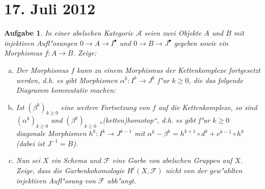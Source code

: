 \documentclass[paper = A4, fontsize=12pt, numbers=noendperiod, chapterprefix=true]{scrbook}
\theoremstyle{break}
\newtheorem{Aufg}{Aufgabe}
\theoremstyle{nonumberbreak}
\theoremstyle{nonumberplain}
\newcommand{\F}{\mathcal{F}} %
\begin{document}
\newpage
\section{17. Juli 2012}
\setcounter{Aufg}{0}
\setcounter{Loes}{0}

\begin{Aufg}
In einer abelschen Kategorie $\mathcal{A}$ seien zwei Objekte $A$ und $B$ mit injektiven Aufl"osungen $0 \to A \to I^\bullet$ und $0 \to B \to J^\bullet$ gegeben sowie ein Morphismus $f \colon A \to B$. Zeige:
\begin{enumerate}[a)]
 \item Der Morphismus $f$ kann zu einem Morphismus der Kettenkomplexe fortgesetzt werden, d.h. es gibt Morphismen $\alpha^k\colon I^k \to J^k$ f"ur $k \geq 0$, die das folgende Diagramm kommutativ machen:
    \begin{center}
  \end{center}
\item Ist $(\beta^k)_{k \geq 0}$ eine weitere Fortsetzung von $f$ auf die Kettenkomplexe, so sind $(\alpha^k)_{k \geq 0}$ und $(\beta^k)_{k\geq 0}$ „(ketten)homotop“, d.h. es gibt f"ur $k \geq 0$ diagonale Morphismen 
 $h^k \colon I^k \to J^{k-1}$ mit $\alpha^k - \beta^k = h^{k+1} \circ d^k + e^{k-1} \circ h^k$ (dabei ist $J^{-1} = B$).
\item Nun sei $X$ ein Schema und $\F$ eine Garbe von abelschen Gruppen auf $X$. Zeige, dass die Garbenkohomologie $H^i(X, \F)$ nicht von der gew"ahlten injektiven Aufl"osung von $\F$ abh"angt. 
\end{enumerate}
\end{Aufg}
\end{document}
